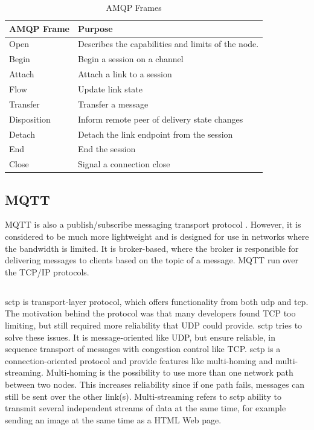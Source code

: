 \begin{table}[h]
\begin{tabularx}{\textwidth}{| X | X |}
\hline
  \textbf{AMQP Frame} & \textbf{Purpose} \\ \hline
  Open & Describes the capabilities and limits of the node. \\ \hline
  Begin & Begin a session on a channel \\ \hline
  Attach & Attach a link to a session \\ \hline
  Flow & Update link state \\ \hline
  Transfer & Transfer a message \\ \hline
  Disposition & Inform remote peer of delivery state changes \\ \hline
  Detach & Detach the link endpoint from the session \\ \hline
  End & End the session\\ \hline
  Close & Signal a connection close\\ \hline
\end{tabularx}
\caption{AMQP Frames}
\label{table-amqp-frames}
\end{table}

\subsection{MQTT}

MQTT is also a publish/subscribe messaging transport protocol \cite{oasis-mqtt}.
However, it is considered to be much more lightweight and is designed for use in
networks where the bandwidth is limited. It is broker-based, where the broker is
responsible for delivering messages to clients based on the topic of a message.
MQTT run over the TCP/IP protocols.


\subsection{}

\gls{sctp} is transport-layer protocol, which offers functionality from both
\gls{udp} and \gls{tcp}\cite{rfc-sctp}. The motivation behind the protocol was
that many developers found TCP too limiting, but still required more reliability
that UDP could provide. \gls{sctp} tries to solve these issues. It is
message-oriented like UDP, but ensure reliable, in sequence transport of
messages with congestion control like TCP. \gls{sctp} is a connection-oriented
protocol and provide features like multi-homing and multi-streaming.
Multi-homing is the possibility to use more than one network path between two
nodes. This increases reliability since if one path fails, messages can still be
sent over the other link(s). Multi-streaming refers to \gls{sctp} ability to
transmit several independent streams of data at the same time, for example
sending an image at the same time as a HTML Web page.

